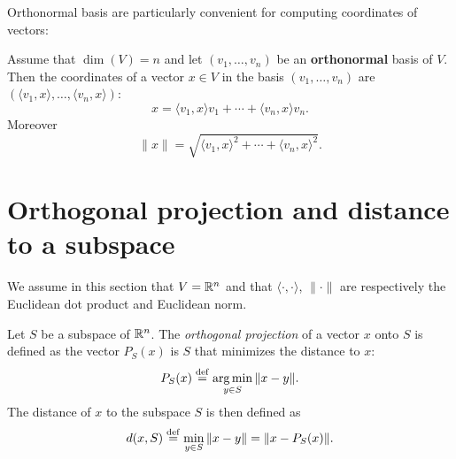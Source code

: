 \documentclass[11pt,nocut]{article}
\begin{document}
Orthonormal basis are particularly convenient for computing coordinates of vectors:

\begin{proposition}\label{prop:coords}
	Assume that $\dim(V)=n$ and let $(v_1, \dots, v_n)$ be an \textbf{orthonormal} basis of $V$. Then the coordinates of a vector $x \in V$ in the basis $(v_1, \dots, v_n)$ are $(\langle v_1, x\rangle, \dots, \langle v_n,x \rangle)$:
	$$
	x = \langle v_1, x \rangle v_1 + \cdots + \langle v_n, x \rangle v_n.
	$$
	Moreover
	$$
	\|x\| = \sqrt{\langle v_1, x \rangle^2 + \cdots + \langle v_n, x \rangle^2}.
	$$
\end{proposition}

\section{Orthogonal projection and distance to a subspace}

We assume in this section that $V = \mathbb{R}^n$ and that $\langle \cdot, \cdot \rangle$, $\| \cdot \|$ are respectively the Euclidean dot product and Euclidean norm.

\begin{definition}
	Let $S$ be a subspace of $\mathbb{R}^n$. The \emph{orthogonal projection} of a vector $x$ onto $S$ is defined as the vector $P_S(x)$ is $S$ that minimizes the distance to $x$:
	$$
	P_S(x) \overset{\rm def}{=} \operatorname*{arg\,min}_{y \in S} \|x - y\|.
	$$
	The distance of $x$ to the subspace $S$ is then defined as
	$$
	d(x,S) \overset{\rm def}{=} \min_{y \in S} \| x - y \| = \|x - P_S(x)\|.
	$$
\end{definition}
\end{document}
